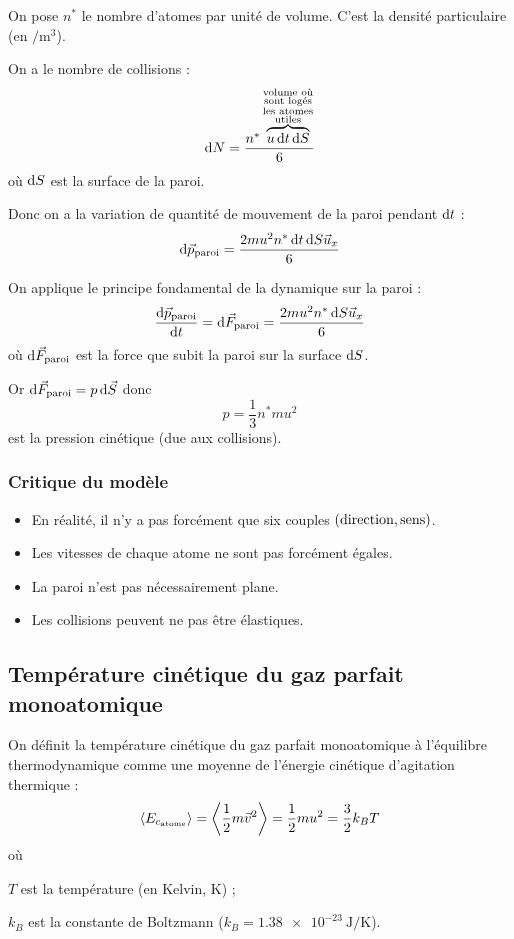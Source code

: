 On pose \(n^*\) le nombre d'atomes par unité de volume. C'est la densité particulaire (en \(\unit{\per\metre\cubed}\)).

On a le nombre de collisions : \[\odif{N}=\dfrac{n^*\overbrace{u\odif{t}\odif{S}}^{\substack{\text{volume où} \\ \text{sont logés} \\ \text{les atomes} \\ \text{utiles}}}}{6}\] où \(\odif{S}\) est la surface de la paroi.

Donc on a la variation de quantité de mouvement de la paroi pendant \(\odif{t}\) : \[\odif{\vec{p}_{\text{paroi}}}=\dfrac{2mu^2n^*\odif{t}\odif{S}\vec{u}_x}{6}\]

On applique le principe fondamental de la dynamique sur la paroi : \[\odv{\vec{p}_{\text{paroi}}}{t}=\odif{\vec{F}_{\text{paroi}}}=\dfrac{2mu^2n^*\odif{S}\vec{u}_x}{6}\] où \(\odif{\vec{F}_{\text{paroi}}}\) est la force que subit la paroi sur la surface \(\odif{S}\).

Or \(\odif{\vec{F}_{\text{paroi}}}=p\odif{\vec{S}}\) donc \[p=\dfrac{1}{3}n^*mu^2\] est la pression cinétique (due aux collisions).

\subsubsection{Critique du modèle}

\begin{itemize}
\item En réalité, il n'y a pas forcément que six couples \(\left(\text{direction},\text{sens}\right)\).

\item Les vitesses de chaque atome ne sont pas forcément égales.

\item La paroi n'est pas nécessairement plane.

\item Les collisions peuvent ne pas être élastiques.
\end{itemize}

\subsection{Température cinétique du gaz parfait monoatomique}

On définit la température cinétique du gaz parfait monoatomique à l'équilibre thermodynamique comme une moyenne de l'énergie cinétique d'agitation thermique : \[\left\langle E_{c_{\text{atome}}}\right\rangle=\left\langle\dfrac{1}{2}m\vec{v}^2\right\rangle=\dfrac{1}{2}mu^2=\dfrac{3}{2}k_BT\] où \begin{description}
\item \(T\) est la température (en Kelvin, \(\unit{\kelvin}\)) ;

\item \(k_B\) est la constante de Boltzmann (\(k_B=\SI{1.38e-23}{\joule\per\kelvin}\)).\\
\end{description}

